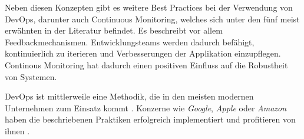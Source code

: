 Neben diesen Konzepten gibt es weitere Best Practices bei der Verwendung von DevOps, darunter auch Continuous Monitoring, welches sich unter den fünf meist erwähnten in der Literatur befindet. Es beschreibt vor allem Feedbackmechanismen. Entwicklungsteams werden dadurch befähigt, kontinuierlich zu iterieren und Verbesserungen der Applikation einzupflegen. Continous Monitoring hat dadurch einen positiven Einfluss auf die Robustheit von Systemen. \cite{012:Compare-and-Contrast-various-Software-Development-Methodologies}

DevOps ist mittlerweile eine Methodik, die in den meisten modernen Unternehmen zum Einsatz kommt \cite{020:Assessing-and-Improving-Quality-of-Docker-Artifacts}. Konzerne wie \textit{Google}, \textit{Apple} oder \textit{Amazon} haben die beschriebenen Praktiken erfolgreich implementiert und profitieren von ihnen \cite{001:DevOps-Adoption-in-Software-Development}.
